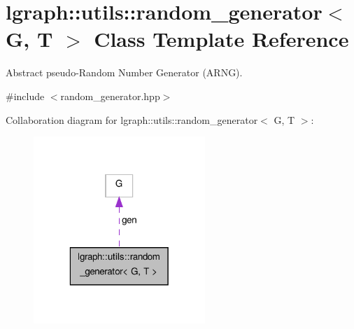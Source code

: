 \hypertarget{classlgraph_1_1utils_1_1random__generator}{\section{lgraph\-:\-:utils\-:\-:random\-\_\-generator$<$ G, T $>$ Class Template Reference}
\label{classlgraph_1_1utils_1_1random__generator}
}


Abstract pseudo-\/\-Random Number Generator (A\-R\-N\-G).  




{\ttfamily \#include $<$random\-\_\-generator.\-hpp$>$}



Collaboration diagram for lgraph\-:\-:utils\-:\-:random\-\_\-generator$<$ G, T $>$\-:\nopagebreak
\begin{figure}[H]
\begin{center}
\leavevmode
\includegraphics[width=184pt]{classlgraph_1_1utils_1_1random__generator__coll__graph}
\end{center}
\end{figure}

